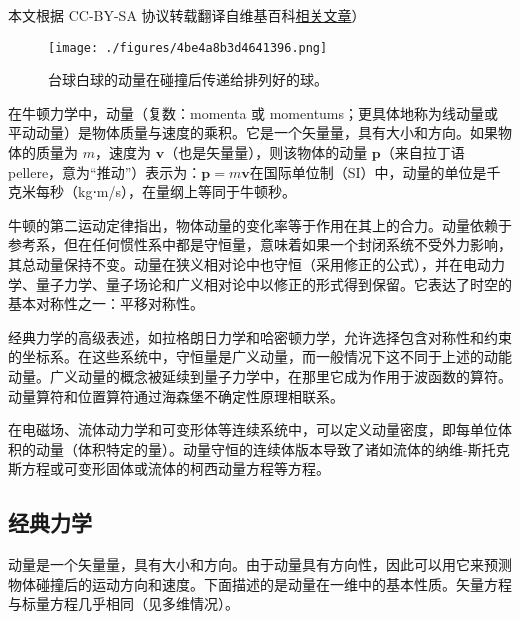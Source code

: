 
本文根据 CC-BY-SA 协议转载翻译自维基百科\href{https://en.wikipedia.org/wiki/Momentum#Conservation}{相关文章}）

\begin{figure}[ht]
\centering
\texttt{[image: ./figures/4be4a8b3d4641396.png]}
\caption{台球白球的动量在碰撞后传递给排列好的球。} \label{fig_DL_1}
\end{figure}
在牛顿力学中，动量（复数：momenta 或 momentums；更具体地称为线动量或平动动量）是物体质量与速度的乘积。它是一个矢量量，具有大小和方向。如果物体的质量为 \( m \)，速度为 \( \mathbf{v} \)（也是矢量量），则该物体的动量 \( \mathbf{p} \)（来自拉丁语 pellere，意为“推动”）表示为：\(\mathbf{p} = m \mathbf{v}\)在国际单位制（SI）中，动量的单位是千克米每秒（kg⋅m/s），在量纲上等同于牛顿秒。

牛顿的第二运动定律指出，物体动量的变化率等于作用在其上的合力。动量依赖于参考系，但在任何惯性系中都是守恒量，意味着如果一个封闭系统不受外力影响，其总动量保持不变。动量在狭义相对论中也守恒（采用修正的公式），并在电动力学、量子力学、量子场论和广义相对论中以修正的形式得到保留。它表达了时空的基本对称性之一：平移对称性。

经典力学的高级表述，如拉格朗日力学和哈密顿力学，允许选择包含对称性和约束的坐标系。在这些系统中，守恒量是广义动量，而一般情况下这不同于上述的动能动量。广义动量的概念被延续到量子力学中，在那里它成为作用于波函数的算符。动量算符和位置算符通过海森堡不确定性原理相联系。

在电磁场、流体动力学和可变形体等连续系统中，可以定义动量密度，即每单位体积的动量（体积特定的量）。动量守恒的连续体版本导致了诸如流体的纳维-斯托克斯方程或可变形固体或流体的柯西动量方程等方程。
\subsection{经典力学}
动量是一个矢量量，具有大小和方向。由于动量具有方向性，因此可以用它来预测物体碰撞后的运动方向和速度。下面描述的是动量在一维中的基本性质。矢量方程与标量方程几乎相同（见多维情况）。